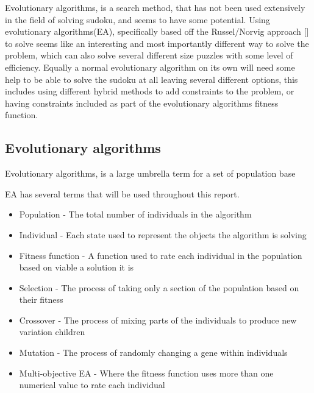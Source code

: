 \documentclass[a4paper,11pt]{article}
\begin{document}
Evolutionary algorithms, is a search method, that has not been used extensively in the field of solving sudoku, and seems to have some potential. Using evolutionary algorithms(EA), specifically based off the Russel/Norvig approach [] to solve seems like an interesting and most importantly different way to solve the problem, which can also solve several different size puzzles with some level of efficiency. Equally a normal evolutionary algorithm on its own will need some help to be able to solve the sudoku at all leaving several different options, this includes using different hybrid methods to add constraints to the problem, or having constraints included as part of the evolutionary algorithms fitness function.\newline\newline

\subsection{Evolutionary algorithms}

Evolutionary algorithms, is a large umbrella term for a set of population base

EA has several terms that will be used throughout this report.\\
\begin{itemize}
	\item Population - The total number of individuals in the algorithm
	\item Individual - Each state used to represent the objects the algorithm is solving
	\item Fitness function - A function used to rate each individual in the population based on viable a solution it is
	\item Selection - The process of taking only a section of the population based on their fitness
	\item Crossover - The process of mixing parts of the individuals to produce new variation children 
	\item Mutation -  The process of randomly changing a gene within individuals
	\item Multi-objective EA - Where the fitness function uses more than one numerical value to rate each individual
\end{itemize}
\end{document}
